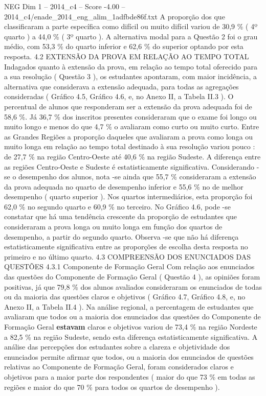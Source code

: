 \begin{textsample}{NEG Dim 1 – 2014\_c4 – Score -4.00 – 2014\_c4/enade\_2014\_eng\_alim\_1adfbde86f.txt}
A proporção dos que classificaram a parte específica como difícil ou muito difícil variou de 30,9 \% ( 4º quarto ) a 44,0 \% ( 3º quarto ).
A alternativa modal para a Questão 2 foi o grau médio, com 53,3 \% do quarto inferior e 62,6 \% do superior optando por esta resposta. 4.2 EXTENSÃO DA PROVA EM RELAÇÃO AO TEMPO TOTAL Indagados quanto à extensão da prova, em relação ao tempo total oferecido para a sua resolução ( Questão 3 ), os estudantes apontaram, com maior incidência, a alternativa que considerava a extensão adequada, para todas as agregações consideradas ( Gráfico 4.5, Gráfico 4.6, e, no Anexo II, a Tabela II.3 ).
O percentual de alunos que responderam ser a extensão da prova adequada foi de 58,6 \%.
Já 36,7 \% dos inscritos presentes consideraram que o exame foi longo ou muito longo e menos do que 4,7 \% o avaliaram como curto ou muito curto.
Entre as Grandes Regiões a proporção daqueles que avaliaram a prova como longa ou muito longa em relação ao tempo total destinado à sua resolução variou pouco : de 27,7 \% na região Centro-Oeste até 40,6 \% na região Sudeste.
A diferença entre as regiões Centro-Oeste e Sudeste é estatisticamente significativa.
Considerando -se o desempenho dos alunos, nota -se ainda que 55,7 \% consideraram a extensão da prova adequada no quarto de desempenho inferior e 55,6 \% no de melhor desempenho ( quarto superior ).
Nos quartos intermediários, esta proporção foi 62,0 \% no segundo quarto e 60,9 \% no terceiro.
No Gráfico 4.6, pode -se constatar que há uma tendência crescente da proporção de estudantes que consideraram a prova longa ou muito longa em função dos quartos de desempenho, a partir do segundo quarto.
Observa -se que não há diferença estatisticamente significativa entre as proporções de escolha desta resposta no primeiro e no último quarto. 4.3 COMPREENSÃO DOS ENUNCIADOS DAS QUESTÕES 4.3.1 Componente de Formação Geral Com relação aos enunciados das questões do Componente de Formação Geral ( Questão 4 ), as opiniões foram positivas, já que 79,8 \% dos alunos avaliados consideraram os enunciados de todas ou da maioria das questões claros e objetivos ( Gráfico 4.7, Gráfico 4.8, e, no Anexo II, a Tabela II.4 ).
Na análise regional, a percentagem de estudantes que avaliaram que todos ou a maioria dos enunciados das questões do Componente de Formação Geral \textbf{estavam} claros e objetivos variou de 73,4 \% na região Nordeste a 82,5 \% na região Sudeste, sendo esta diferença estatisticamente significativa.
A análise das percepções dos estudantes sobre a clareza e objetividade dos enunciados permite afirmar que todos, ou a maioria dos enunciados de questões relativas ao Componente de Formação Geral, foram considerados claros e objetivos para a maior parte dos respondentes ( maior do que 73 \% em todas as regiões e maior do que 70 \% para todos os quartos de desempenho ).

\end{textsample}

